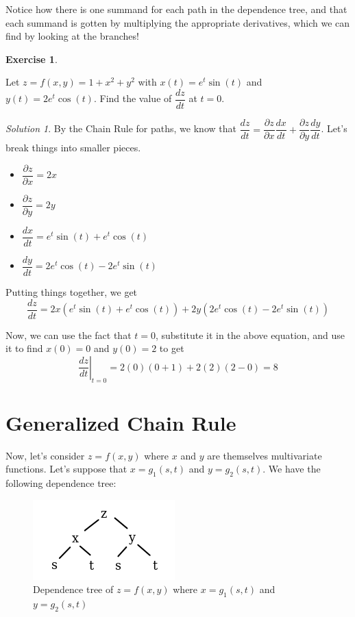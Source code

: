 \documentclass[
]{book}
\providecommand{\tightlist}{%
  \setlength{\itemsep}{0pt}\setlength{\parskip}{0pt}}
\theoremstyle{definition}
\theoremstyle{definition}
\theoremstyle{definition}
\newtheorem{exercise}{Exercise}[chapter]
\theoremstyle{definition}
\theoremstyle{remark}
\newtheorem*{solution}{Solution}
\begin{document}
Notice how there is one summand for each path in the dependence tree, and that each summand is gotten by multiplying the appropriate derivatives, which we can find by looking at the branches!

\begin{exercise}
\protect\hypertarget{exr:unlabeled-div-42}{}\label{exr:unlabeled-div-42}

Let \(z=f(x,y)=1+x^2+y^2\) with \(x(t)=e^t\sin(t)\) and \(y(t)=2e^t\cos(t)\). Find the value of \(\dfrac{dz}{dt}\) at \(t=0\).

\end{exercise}

\begin{solution}

By the Chain Rule for paths, we know that \(\dfrac{dz}{dt}=\dfrac{\partial z}{\partial x}\dfrac{dx}{dt}+\dfrac{\partial z}{\partial y}\dfrac{dy}{dt}\). Let's break things into smaller pieces.

\begin{itemize}
\tightlist
\item
  \(\dfrac{\partial z}{\partial x}=2x\)
\item
  \(\dfrac{\partial z}{\partial y}=2y\)
\item
  \(\dfrac{dx}{dt}=e^t\sin(t)+e^t\cos(t)\)
\item
  \(\dfrac{dy}{dt}=2e^t\cos(t)-2e^t\sin(t)\)
\end{itemize}

Putting things together, we get \[\dfrac{dz}{dt}= 2x (e^t\sin(t)+e^t\cos(t)) + 2y(2e^t\cos(t)-2e^t\sin(t))\]

Now, we can use the fact that \(t=0\), substitute it in the above equation, and use it to find \(x(0)=0\) and \(y(0)=2\) to get \[\left .\dfrac{dz}{dt}\right|_{t=0} = 2(0)(0+1)+2(2)(2-0)=8\]

\end{solution}

\hypertarget{generalized-chain-rule}{%
\section{Generalized Chain Rule}\label{generalized-chain-rule}}

Now, let's consider \(z=f(x,y)\) where \(x\) and \(y\) are themselves multivariate functions. Let's suppose that \(x=g_1(s,t)\) and \(y=g_2(s,t)\). We have the following dependence tree:\\

\begin{figure}

{\centering \includegraphics[width=0.3\linewidth]{images/gen-dt} 

}

\caption{Dependence tree of $z=f(x,y)$ where $x=g_1(s,t)$ and $y=g_2(s,t)$}\label{fig:unnamed-chunk-13}
\end{figure}
\end{document}
